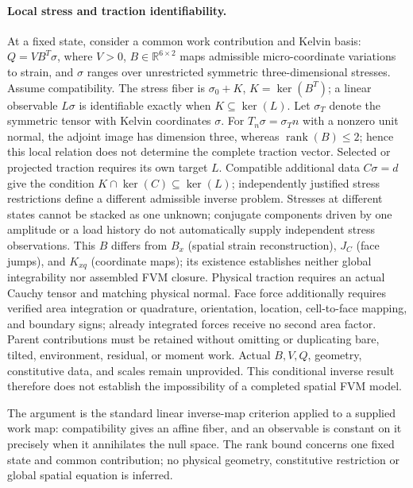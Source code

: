\documentclass[11pt]{article}
\begin{document}
\paragraph{Local stress and traction identifiability.}
At a fixed state, consider a common work contribution and Kelvin basis:
\(Q=VB^{T}\sigma\), where \(V>0\), \(B\in\mathbb{R}^{6\times2}\) maps admissible
micro-coordinate variations to strain, and \(\sigma\) ranges over unrestricted
symmetric three-dimensional stresses. Assume compatibility.
The stress fiber is \(\sigma_0+K\), \(K=\ker(B^{T})\); a linear observable
\(L\sigma\) is identifiable exactly when \(K\subseteq\ker(L)\).
Let \(\sigma_T\) denote the symmetric tensor with Kelvin coordinates \(\sigma\).
For \(T_n\sigma=\sigma_T n\) with a nonzero unit normal, the adjoint image has
dimension three, whereas \(\operatorname{rank}(B)\leq2\); hence this local
relation does not determine the complete traction vector.
Selected or projected traction requires its own target \(L\).
Compatible additional data \(C\sigma=d\) give the condition
\(K\cap\ker(C)\subseteq\ker(L)\); independently justified stress restrictions
define a different admissible inverse problem.
Stresses at different states cannot be stacked as one unknown; conjugate
components driven by one amplitude or a load history do not automatically
supply independent stress observations.
This \(B\) differs from \(B_x\) (spatial strain reconstruction), \(J_C\)
(face jumps), and \(K_{xq}\) (coordinate maps); its existence establishes
neither global integrability nor assembled FVM closure.
Physical traction requires an actual Cauchy tensor and matching physical normal.
Face force additionally requires verified area integration or quadrature,
orientation, location, cell-to-face mapping, and boundary signs; already
integrated forces receive no second area factor.
Parent contributions must be retained without omitting or duplicating bare,
tilted, environment, residual, or moment work.
Actual \(B,V,Q\), geometry, constitutive data, and scales remain unprovided.
This conditional inverse result therefore does not establish the impossibility
of a completed spatial FVM model.

The argument is the standard linear inverse-map criterion applied to a
supplied work map: compatibility gives an affine fiber, and an observable is
constant on it precisely when it annihilates the null space. The rank bound
concerns one fixed state and common contribution; no physical geometry,
constitutive restriction or global spatial equation is inferred.
\end{document}
